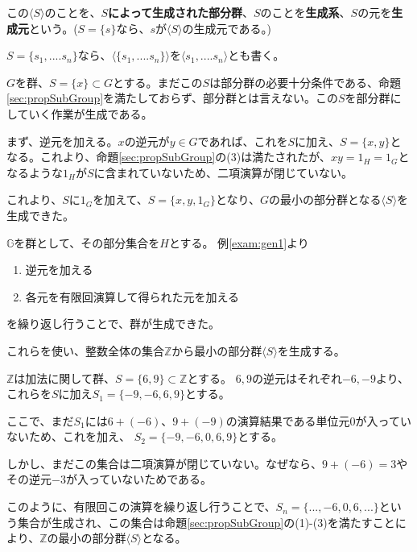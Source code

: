 \documentclass[dvipdfmx,autodetect-engine]{jsarticle}
\begin{document}
 この$\langle S \rangle$のことを、{\bf $S$によって生成された部分群}、$S$のことを{\bf 生成系}、$S$の元を{\bf 生成元}という。($S = \{s\}$なら、$s$が$\langle S \rangle$の生成元である。)

$S = \{s_{1}, .... s_{n}  \}$なら、$\langle \{s_{1}, .... s_{n}  \} \rangle$を$\langle s_{1}, .... s_{n} \rangle$とも書く。


$G$を群、$S = \{x\} \subset G$とする。まだこの$S$は部分群の必要十分条件である、命題\ref{sec:propSubGroup}を満たしておらず、部分群とは言えない。この$S$を部分群にしていく作業が生成である。

まず、逆元を加える。$x$の逆元が$y \in G$であれば、これを$S$に加え、$S = \{x, y\}$となる。これより、命題\ref{sec:propSubGroup}の(3)は満たされたが、$x y = 1_{H} = 1_{G}$となるような$1_{H}$が$S$に含まれていないため、二項演算が閉じていない。

これより、$S$に$1_{G}$を加えて、$S=\{x, y, 1_{G}\}$となり、$G$の最小の部分群となる$\langle S \rangle$を生成できた。


$\mathbb{G}$を群として、その部分集合を$H$とする。
例\ref{exam:gen1}より

\begin{enumerate}
\renewcommand{\labelenumi}{(\arabic{enumi})}
\item 逆元を加える
\item 各元を有限回演算して得られた元を加える
\end{enumerate}

を繰り返し行うことで、群が生成できた。

これらを使い、整数全体の集合$\mathbb{Z}$から最小の部分群$\langle S \rangle$を生成する。

$\mathbb{Z}$は加法に関して群、$S = \{6, 9\} \subset \mathbb{Z}$とする。
$6, 9$の逆元はそれぞれ$-6, -9$より、これらを$S$に加え$S_{1} = \{-9, -6, 6, 9\}$とする。

ここで、まだ$S_{1}$には$6+(-6)$、$9+(-9)$の演算結果である単位元$0$が入っていないため、これを加え、
$S_{2} = \{-9, -6, 0, 6, 9\}$とする。

しかし、まだこの集合は二項演算が閉じていない。なぜなら、$9+(-6) = 3$やその逆元$-3$が入っていないためである。

このように、有限回この演算を繰り返し行うことで、$S_{n} = \{..., -6, 0, 6, ...\}$という集合が生成され、この集合は命題\ref{sec:propSubGroup}の(1)-(3)を満たすことにより、$\mathbb{Z}$の最小の部分群$\langle S \rangle$となる。
\end{document}
